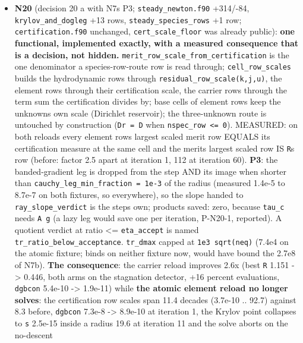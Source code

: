 \documentclass[english,a4paper]{my_memo}
\begin{document}
\begin{itemize}
\item
  \textbf{N20} (decision 20 a with N7\textquotesingle s P3; \texttt{steady\_newton.f90} +314/-84,
  \texttt{krylov\_and\_dogleg} +13 rows, \texttt{steady\_species\_rows} +1 row;
  \texttt{certification.f90} unchanged, \texttt{cert\_scale\_floor} was already public):
  \textbf{one functional, implemented exactly, with a measured consequence that
  is a decision, not hidden.} \texttt{merit\_row\_scale\_from\_certification} is the
  one denominator a species-row-route row is read through; \texttt{cell\_row\_scales}
  builds the hydrodynamic rows through \texttt{residual\_row\_scale(k,j,u)}, the
  element rows through their certification scale, the carrier rows through
  the term sum the certification divides by; base cells of element rows
  keep the unknown\textquotesingle s own scale (Dirichlet reservoir); the three-unknown
  route is untouched by construction (\texttt{Dr\ =\ D} when \texttt{nspec\_row\ \textless{}=\ 0}).
  MEASURED: on both reloads every element row\textquotesingle s largest scaled merit row
  EQUALS its certification measure at the same cell and the merit\textquotesingle s largest
  scaled row IS \texttt{\textbar{}\textbar{}R\textbar{}\textbar{}}\textquotesingle s row (before: factor 2.5 apart at iteration 1, 112
  at iteration 60). \textbf{P3}: the banded-gradient leg is dropped from the
  step AND its image when shorter than \texttt{cauchy\_leg\_min\_fraction\ =\ 1e-3} of
  the radius (measured 1.4e-5 to 8.7e-7 on both fixtures, so everywhere),
  so the slope handed to \texttt{ray\_slope\_verdict} is the step\textquotesingle s own; products
  saved: zero, because \texttt{tau\_c} needs \texttt{A\ g} (a lazy leg would save one per
  iteration, P-N20-1, reported). A quotient verdict at ratio \textless= \texttt{eta\_accept}
  is named \texttt{tr\_ratio\_below\_acceptance}. \texttt{tr\_dmax} capped at \texttt{1e3\ sqrt(neq)}
  (7.4e4 on the atomic fixture; binds on neither fixture now, would have
  bound the 2.7e8 of N7b). \textbf{The consequence}: the carrier reload improves
  2.6x (best \texttt{\textbar{}\textbar{}R\textbar{}\textbar{}} 1.151 -\textgreater{} 0.446, both arms on the stagnation detector,
  +16 percent evaluations, \texttt{dgbcon} 5.4e-10 -\textgreater{} 1.9e-11) while \textbf{the atomic
  element reload no longer solves}: the certification row scales span 11.4
  decades (3.7e-10 .. 92.7) against 8.3 before, \texttt{dgbcon} 7.3e-8 -\textgreater{} 8.9e-10
  at iteration 1, the Krylov point collapses to \texttt{\textbar{}\textbar{}s\textbar{}\textbar{}} 2.5e-15 inside a
  radius 19.6 at iteration 11 and the solve aborts on the no-descent

\end{itemize}
\end{document}
